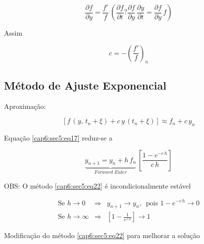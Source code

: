 \begin{equation}
 \label{cap6:sec5:eq19}
 \frac{\partial f}{\partial y} = \frac{f'}{f} \, \left( \frac{\partial f}{\partial t} ? \frac{\partial f}{\partial y} \, \frac{\partial y}{\partial t} = \frac{\partial f}{\partial y} \, f \right)
\end{equation}

Assim

\begin{equation}
 \label{cap6:sec5:eq20}
 c = - \left( \frac{f'}{f} \right)_n
\end{equation}

\subsection{Método de Ajuste Exponencial}

Aproximação:

\begin{equation}
 \label{cap6:sec5:eq21}
 [f \, (y, \, t_n + \xi) + c \, y \, (t_n + \xi)] \approx f_n + c \, y_n
\end{equation}

Equação \ref{cap6:sec5:eq17} reduz-se a

\begin{equation}
 \label{cap6:sec5:eq22}
 \underbrace{y_{n+1} = y_n + h \, f_n}_{Forward \, \, Euler} \, \left[\frac{1 - e^{-c\,h}}{c\,h}\right]
\end{equation}

OBS: O método \ref{cap6:sec5:eq22} é incondicionalmente estável

\[
 \begin{array}{lll}
  \mbox{Se } h \rightarrow 0 & \Rightarrow & y_{n+1} \rightarrow y_n , \, \mbox{ pois } 1 - e^{-c\,h} \rightarrow 0 \\
  \mbox{Se } h \rightarrow \infty & \Rightarrow & \left[ 1 - \displaystyle \frac{1}{e^{\,c\,h}} \right] \rightarrow 1
 \end{array}
\]

Modificação do método \ref{cap6:sec5:eq22} para melhorar a solução

